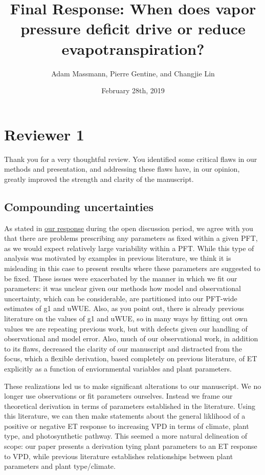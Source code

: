 \documentclass[12pt]{article}
\title{Final Response: When does vapor pressure deficit drive or
  reduce evapotranspiration?}
\author{Adam Massmann, Pierre Gentine, and Changjie Lin}
\date{February 28th, 2019}
\begin{document}
\section{Reviewer 1}

Thank you for a very thoughtful review. You identified some critical
flaws in our methods and presentation, and addressing these flaws
have, in our opinion, greatly improved the strength and clarity of the
manuscript.

\subsection{Compounding uncertainties}
\label{pft}
As stated in
\href{https://editor.copernicus.org/index.php/hess-2018-553-AC1.pdf}{our
  response} during the open discussion period, we agree
with you that there are problems prescribing any parameters as fixed
within a given PFT, as we would expect relatively large variability
within a PFT. While this type of analysis was motivated by examples in
previous literature, we think it is misleading in this case to present
results where these parameters are suggested to be fixed. These issues
were exacerbated by the manner in which we fit our parameters: it was
unclear given our methods how model and observational uncertainty,
which can be considerable, are partitioned into our PFT-wide estimates
of g1 and uWUE. Also, as you point out, there is already previous
literature on the values of g1 and uWUE, so in many ways by fitting
out own values we are repeating previous work, but with defects given
our handling of observational and model error. Also, much of our
observational work, in addition to its flaws, decreased the clarity of
our manuscript and distracted from the focus, which a flexible
derivation, based completely on previous literature, of ET explicitly
as a function of enviornmental variables and plant parameters.

These realizations led us to make significant alterations to our
manuscript. We no longer use observations or fit parameters
ourselves. Instead we frame our theoretical derivation in terms of
parameters established in the literature. Using this literature, we
can then make statements about the general liklihood of a positive or
negative ET response to increasing VPD in terms of climate, plant
type, and photosynthetic pathway. This seemed a more natural
delineation of scope: our paper presents a derivation tying plant
parameters to an ET response to VPD, while previous literature
establishes relationships between plant parameters and plant
type/climate.
\end{document}
